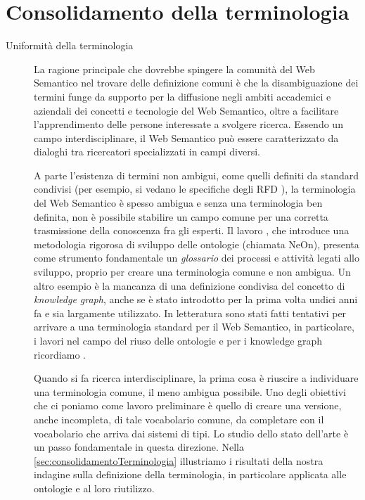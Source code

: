 \section{Consolidamento della terminologia}
\label{sec:consolidamentoTerminologia}
\begin{description}
	\item[Uniformità della terminologia] La ragione principale che dovrebbe spingere la comunità del Web Semantico nel trovare delle definizione comuni è che la disambiguazione dei termini funge da supporto per la diffusione negli ambiti accademici e aziendali dei concetti e tecnologie del Web Semantico, oltre a facilitare l'apprendimento delle persone interessate a svolgere ricerca. Essendo un campo interdisciplinare, il Web Semantico può essere caratterizzato da dialoghi tra ricercatori specializzati in campi diversi.
	
	A parte l'esistenza di termini non ambigui, come quelli definiti da standard condivisi (per esempio, si vedano le specifiche degli RFD \cite{RDFspecification}), la terminologia del Web Semantico è spesso ambigua e senza una terminologia ben definita, non è possibile stabilire un campo comune per una corretta trasmissione della conoscenza fra gli esperti. Il lavoro \cite{NeOn}, che introduce una metodologia rigorosa di sviluppo delle ontologie (chiamata NeOn), presenta come strumento fondamentale un \emph{glossario} dei processi e attività legati allo sviluppo, proprio per creare una terminologia comune e non ambigua.  Un altro esempio è la mancanza di una definizione condivisa del concetto di \textit{knowledge graph}, anche se è stato introdotto per la prima volta undici anni fa e sia largamente utilizzato. In letteratura sono stati fatti tentativi per arrivare a una terminologia standard per il Web Semantico, in particolare, i lavori \cite{katsumi2018ontology, goy2015ontologies, NeOn} nel campo del riuso delle ontologie e per i knowledge graph ricordiamo \cite{ehrlinger2016towards}. 
	
	Quando si fa ricerca interdisciplinare, la prima cosa è riuscire a individuare una terminologia comune, il meno ambigua possibile. Uno degli obiettivi che ci poniamo come lavoro preliminare è quello di creare una versione, anche incompleta, di tale vocabolario comune, da completare con il vocabolario che arriva dai sistemi di tipi. Lo studio dello stato dell'arte è un passo fondamentale in questa direzione. Nella \autoref{sec:consolidamentoTerminologia} illustriamo i risultati della nostra indagine sulla definizione della terminologia, in particolare applicata alle ontologie e al loro riutilizzo.
	

\end{description}
